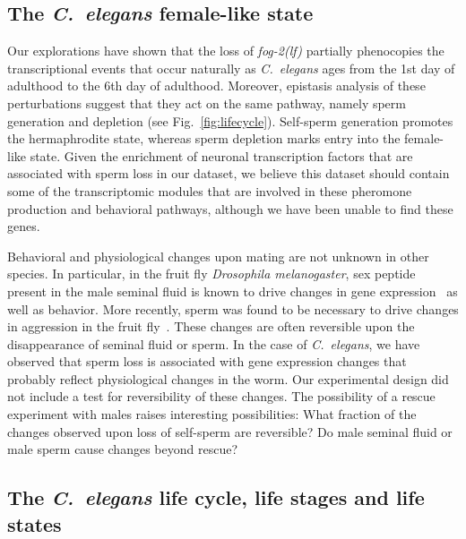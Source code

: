 \documentclass[9pt,twocolumn,twoside]{gsag3jnl}
\newcommand{\cel}{\emph{C.~elegans}}
\newcommand{\fog}{\emph{\mbox{fog-2(lf)}}}
\begin{document}
\subsection*{The \cel{} female-like state}
\label{sub:female_state}
Our explorations have shown that the loss of \fog{} partially phenocopies the
transcriptional events that occur naturally as \cel{} ages from the 1st day of
adulthood to the 6th day of adulthood. Moreover, epistasis analysis of these
perturbations suggest that they act on the same pathway, namely sperm generation
and depletion (see Fig.~\ref{fig:lifecycle}). Self-sperm generation promotes the
hermaphrodite state, whereas sperm depletion marks entry into the female-like
state. Given the enrichment of neuronal transcription factors that are
associated with sperm loss in our dataset, we believe this dataset should
contain some of the transcriptomic modules that are involved in these pheromone
production and behavioral pathways, although we have been unable to find these
genes.

Behavioral and physiological changes upon mating are not unknown in other
species. In particular, in the fruit fly \emph{Drosophila melanogaster}, sex
peptide present in the male seminal fluid is known to drive changes in gene
expression~\citep{Liu2003,Xue2000,Avila2011} as well as behavior. More recently,
sperm was found to be necessary to drive changes in aggression in the fruit
fly~\citep{Bath2017}. These changes are often reversible upon the disappearance
of seminal fluid or sperm. In the case of \cel{}, we have observed that sperm
loss is associated with gene expression changes that probably reflect
physiological changes in the worm. Our experimental design did not include a
test for reversibility of these changes. The possibility of a rescue experiment
with males raises interesting possibilities: What fraction of the changes
observed upon loss of self-sperm are reversible? Do male seminal fluid or male
sperm cause changes beyond rescue?

\subsection*{The \cel{} life cycle, life stages and life states}
\end{document}
